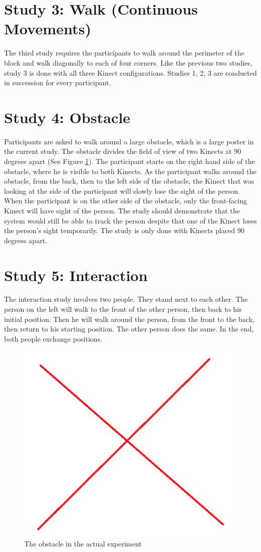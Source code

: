 \section{Study 3: Walk (Continuous Movements)}
\label{sec:studies_stationary}

The third study requires the participants to walk around the perimeter of the block and walk diagonally to each of four corners. Like the previous two studies, study 3 is done with all three Kinect configurations. Studies 1, 2, 3 are conducted in succession for every participant.

\section{Study 4: Obstacle}
\label{sec:studies_stationary}

Participants are asked to walk around a large obstacle, which is a large poster in the current study. The obstacle divides the field of view of two Kinects at 90 degrees apart (See Figure \ref{fig:studies_obstacle}). The participant starts on the right hand side of the obstacle, where he is visible to both Kinects. As the participant walks around the obstacle, from the back, then to the left side of the obstacle, the Kinect that was looking at the side of the participant will slowly lose the sight of the person. When the participant is on the other side of the obstacle, only the front-facing Kinect will have sight of the person. The study should demonstrate that the system would still be able to track the person despite that one of the Kinect loses the person's sight temporarily. The study is only done with Kinects placed 90 degrees apart.


\section{Study 5: Interaction}
\label{sec:studies_interaction}

The interaction study involves two people. They stand next to each other. The person on the left will walk to the front of the other person, then back to his initial position. Then he will walk around the person, from the front to the back, then return to his starting position. The other person does the same. In the end, both people exchange positions.

\begin{figure}[!h]
  \centering
  \includegraphics[width=0.8\linewidth]{figs/studies_obstacle}
  \caption{The obstacle in the actual experiment}
  \label{fig:studies_obstacle}
\end{figure}




